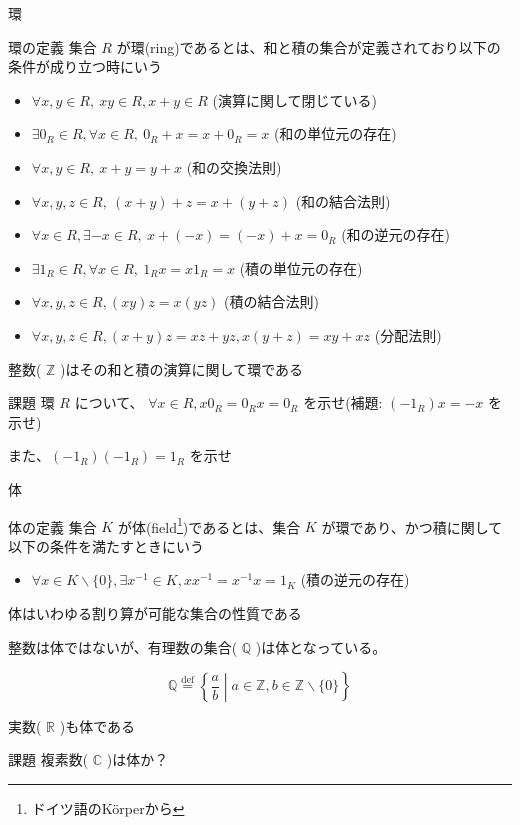 \documentclass[dvipdfmx,12pt,a4paper,handout]{beamer}
\newcommand{\relmiddle}[1]{\mathrel{}\middle#1\mathrel{}}
\begin{document}
\begin{frame}{環}
 \begin{block}{環の定義}
  集合 $R$ が環(ring)であるとは、和と積の集合が定義されており以下の条件が成り立つ時にいう
  \begin{itemize}
   \item $\forall x, y \in R,\ xy \in R, x + y \in R$ (演算に関して閉じている)
   \item $\exists 0_R \in R, \forall x \in R,\ 0_R + x = x + 0_R = x$ (和の単位元の存在)
   \item $\forall x, y \in R, \ x + y = y + x$ (和の交換法則)
   \item $\forall x, y, z \in R, \ (x + y) + z = x + (y + z)$ (和の結合法則)
   \item $\forall x \in R, \exists -x \in R,\ x + (-x) = (-x) + x = 0_R$ (和の逆元の存在)
   \item $\exists 1_R \in R, \forall x \in R,\ 1_R x = x1_R = x$ (積の単位元の存在)
   \item $\forall x, y, z \in R, (xy)z = x(yz)$ (積の結合法則)
   \item $\forall x, y, z \in R, (x + y)z = xz + yz, x(y + z) = xy + xz$ (分配法則)
  \end{itemize}
 \end{block}
 整数( $\mathbb{Z}$ )はその和と積の演算に関して環である

 \begin{block}{課題}
  環 $R$ について、 $\forall x \in R, x0_R = 0_Rx = 0_R$ を示せ(補題: $(-1_R)x = -x$ を示せ)

  また、$(-1_R)(-1_R) = 1_R$ を示せ
 \end{block}

\end{frame}

\begin{frame}{体}
 \begin{block}{体の定義}
  集合 $K$ が体(field\footnote{ドイツ語のK\"{o}rperから})であるとは、集合 $K$ が環であり、かつ積に関して以下の条件を満たすときにいう
  \begin{itemize}
   \item $\forall x \in K \backslash \{0\}, \exists x^{-1} \in K, xx^{-1} = x^{-1}x = 1_K$ (積の逆元の存在)
  \end{itemize}
 \end{block}
 体はいわゆる割り算が可能な集合の性質である

 整数は体ではないが、有理数の集合( $\mathbb{Q}$ )は体となっている。

 \[
  \mathbb{Q} \overset{\text{def}}{=} \left\{\frac{a}{b} \relmiddle| a \in \mathbb{Z}, b \in \mathbb{Z} \backslash \{0\} \right\}
 \]

 実数( $\mathbb{R}$ )も体である

 \begin{block}{課題}
  複素数( $\mathbb{C}$ )は体か？
 \end{block}
\end{frame}
\end{document}
